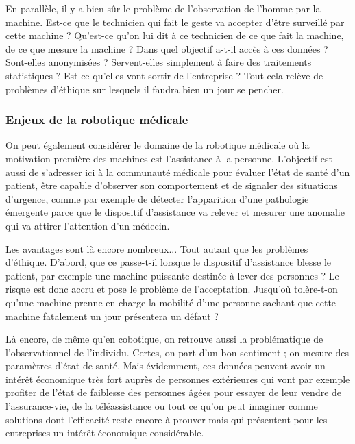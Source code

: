 En parallèle, il y a bien sûr le problème de l'observation de l'homme par la machine. Est-ce que le technicien qui fait le geste va accepter d'être surveillé par cette machine ? Qu'est-ce qu'on lui dit à ce technicien de ce que fait la machine, de ce que mesure la machine ? Dans quel objectif a-t-il accès à ces données ? Sont-elles anonymisées ? Servent-elles simplement à faire des traitements statistiques ? Est-ce qu'elles vont sortir de l'entreprise ? Tout cela relève de problèmes d'éthique sur lesquels il faudra bien un jour se pencher. 
 
\subsubsection[Enjeux de la robotique médicale]{Enjeux de la robotique médicale}
\label{subsub:III.3.1.3}

On peut également considérer le domaine de la robotique médicale où la motivation première des machines est l'assistance à la personne. L’objectif est aussi de s’adresser ici à la communauté médicale pour évaluer l'état de santé d'un patient, être capable d'observer son comportement et de signaler des situations d'urgence, comme par exemple de détecter l'apparition d'une pathologie émergente parce que le dispositif d'assistance va relever et mesurer une anomalie qui va attirer l'attention d'un médecin.

Les avantages sont là encore nombreux... Tout autant que les problèmes d'éthique. D'abord, que ce passe-t-il lorsque le dispositif d'assistance blesse le patient, par exemple une machine puissante destinée à lever des personnes ? Le risque est donc accru et pose le problème de l'acceptation. Jusqu'où tolère-t-on qu'une machine prenne en charge la mobilité d'une personne sachant que cette machine fatalement un jour présentera un défaut ?

Là encore, de même qu'en cobotique, on retrouve aussi la problématique de l'observationnel de l'individu. Certes, on part d'un bon sentiment ; on mesure des paramètres d'état de santé. Mais évidemment, ces données peuvent avoir un intérêt économique très fort auprès de personnes extérieures qui vont par exemple profiter de l'état de faiblesse des personnes âgées pour essayer de leur vendre de l'assurance-vie, de la téléassistance ou tout ce qu'on peut imaginer comme solutions dont l'efficacité reste encore à prouver mais qui présentent pour les entreprises un intérêt économique considérable. 

